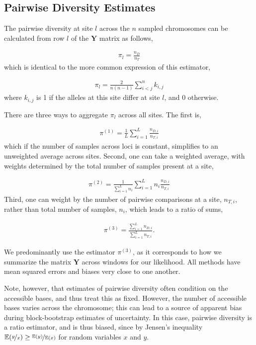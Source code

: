 \documentclass[11pt]{article}
\newcommand{\E}{\mathbb{E}}
\begin{document}
\subsection{Pairwise Diversity Estimates}
\label{suppsec:diversity}

The pairwise diversity at site $l$ across the $n$ sampled chromosomes can be
calculated from row $l$ of the $\mathbf{Y}$ matrix as follows,

\begin{align}
  \pi_l = \frac{n_D}{n_T}
\end{align}
%
which is identical to the more common expression of this estimator, 

\begin{align}
  \pi_l = \frac{2}{n(n-1)} \sum_{i < j}^n k_{i,j}
\end{align}
%
where $k_{i,j}$ is 1 if the alleles at this site differ at site $l$, and 0
otherwise.

There are three ways to aggregate $\pi_l$ across all sites. The first is,

\begin{align}
  \label{eq:}
  \pi^{(1)} = \frac{1}{L} \sum_{i=1}^L \frac{n_{D,i}}{n_{T,i}}
\end{align}
%
which if the number of samples across loci is constant, simplifies to an
unweighted average across sites. Second, one can take a weighted average, with
weights determined by the total number of samples present at a site,

\begin{align}
  \label{eq:}
  \pi^{(2)} = \frac{1}{\sum_{i=1}^L n_i} \sum_{i=1}^L n_i \frac{n_{D,i}}{n_{T,i}}
\end{align}
%
Third, one can weight by the number of pairwise comparisons at a site,
$n_{T,i}$, rather than total number of samples, $n_i$, which leads to a ratio
of sums,

\begin{align}
  \label{eq:}
  \pi^{(3)} = \frac{\sum_{i=1}^L n_{D,i}}{\sum_{i=1}^L n_{T,i}}.
\end{align}

We predominantly use the estimator $\pi^{(3)}$, as it corresponds to how we
summarize the matrix $\mathbf{Y}$ across windows for our likelihood. All
methods have mean squared errors and biases very close to one another.

Note, however, that estimates of pairwise diversity often condition on the
accessible bases, and thus treat this as fixed. However, the number of
accessible bases varies across the chromosome; this can lead to a source of
apparent bias during block-bootstrap estimates of uncertainty.  In this case,
pairwise diversity is a ratio estimator, and is thus biased, since by Jensen's
inequality $\E(\nicefrac{y}{x}) \ge \nicefrac{\E(y)}{\E(x)}$ for random
variables $x$ and $y$. 
\end{document}
